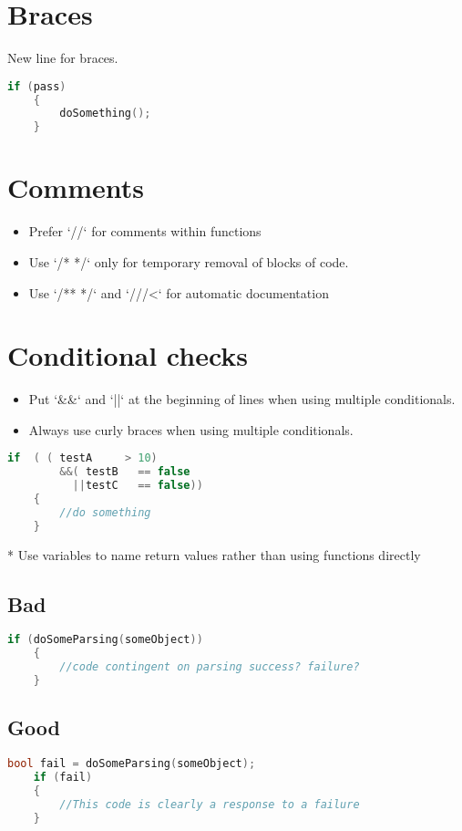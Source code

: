 \section{Braces}

New line for braces.
\begin{lstlisting}[language=c++]
    if (pass)
    {
        doSomething();
    }
\end{lstlisting}

\section{Comments}

\begin{itemize}
\item Prefer `//` for comments within functions
\item Use `/* */` only for temporary removal of blocks of code.
\item Use `/** */` and `///<` for automatic documentation
\end{itemize}

\section{Conditional checks}
%
\begin{itemize}
\item  Put `\&\&` and `||` at the beginning of lines when using multiple conditionals.
\item  Always use curly braces when using multiple conditionals.
\end{itemize}
%
\begin{lstlisting}[language=c++]
    if  ( ( testA     > 10)
        &&( testB   == false
          ||testC   == false))
    {
        //do something
    }
\end{lstlisting}

* Use variables to name return values rather than using functions directly

\subsection{Bad}

\begin{lstlisting}[language=c++]
    if (doSomeParsing(someObject))
    {
        //code contingent on parsing success? failure?
    }
\end{lstlisting}

\subsection{Good}
\begin{lstlisting}[language=c++]
    bool fail = doSomeParsing(someObject);
    if (fail)
    {
        //This code is clearly a response to a failure
    }
\end{lstlisting}

